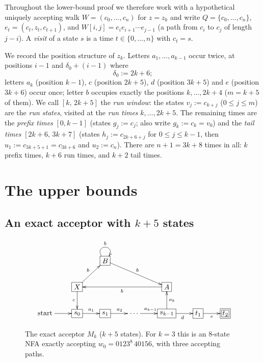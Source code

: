 \documentclass[11pt]{article}
\theoremstyle{definition}
\begin{document}
Throughout the lower-bound proof we therefore work with a hypothetical
uniquely accepting walk $W=(c_0,\dots,c_n)$ for $z=z_k$ and write
$Q=\{c_0,\dots,c_n\}$, $e_t=(c_t,z_t,c_{t+1})$, and $W[i,j]=e_ie_{i+1}\cdots
e_{j-1}$ (a path from $c_i$ to $c_j$ of length $j-i$). A \emph{visit} of a
state $s$ is a time $t\in\{0,\dots,n\}$ with $c_t=s$.

We record the position structure of $z_k$. Letters $a_1,\dots,a_{k-1}$ occur
twice, at positions $i-1$ and $\delta_0+(i-1)$ where
\[
\delta_0:=2k+6;
\]
letters $a_k$ (position $k-1$), $c$ (position $2k+5$), $d$ (position $3k+5$)
and $e$ (position $3k+6$) occur once; letter $b$ occupies exactly the
positions $k,\dots,2k+4$ ($m=k+5$ of them). We call
$[k,\,2k+5]$ the \emph{run window}: the states $v_j:=c_{k+j}$
($0\le j\le m$) are the \emph{run states}, visited at the \emph{run times}
$k,\dots,2k+5$. The remaining times are the \emph{prefix times} $[0,k-1]$
(states $g_j:=c_j$; also write $g_k:=c_k=v_0$) and the \emph{tail times}
$[2k+6,\,3k+7]$ (states $h_j:=c_{2k+6+j}$ for $0\le j\le k-1$, then
$u_1:=c_{3k+5+1}=c_{3k+6}$ and $u_2:=c_n$). There are $n+1=3k+8$ times in all:
$k$ prefix times, $k+6$ run times, and $k+2$ tail times.

\section{The upper bounds}\label{sec:upper}

\subsection{An exact acceptor with \texorpdfstring{$k+5$}{k+5} states}

\begin{figure}[t]
\centering
\[
\xymatrix{
& & *+[F]{B}\ar@(ul,ur)^b\ar[drr]^b & & & & \\
&*+[F]{X}\ar[ur]^b\ar[d]_c & & &*+[F]{A}\ar[lll]^b & & \\
\text{start}\ar[r]&	*+[F]{s_0} \ar[r]^{a_1} & *+[F]{s_1} \ar[r]^{a_2} & \cdots \ar[r]^{a_{k-1}} & *+[F]{s_{k-1}}\ar[u]_{a_k}\ar[r]_d & *+[F]{t_1}\ar[r]_e & *+[F=]{t_2}\\
	}
\]
\caption{The exact acceptor $M_k$ ($k+5$ states). For $k=3$ this is an
$8$-state NFA exactly accepting $w_0=0123^8\,40156$, with three accepting
paths.}\label{fig:M3}
\end{figure}
\end{document}
